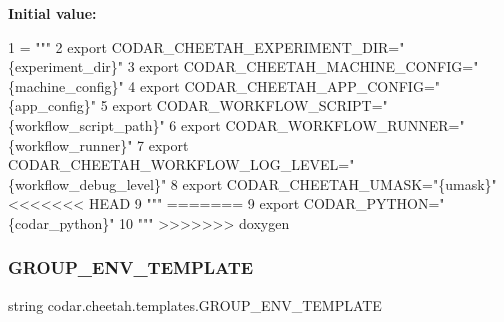 {\bfseries Initial value\+:}
\begin{DoxyCode}
1 =  \textcolor{stringliteral}{"""}
2 \textcolor{stringliteral}{export CODAR\_CHEETAH\_EXPERIMENT\_DIR="\{experiment\_dir\}"}
3 \textcolor{stringliteral}{export CODAR\_CHEETAH\_MACHINE\_CONFIG="\{machine\_config\}"}
4 \textcolor{stringliteral}{export CODAR\_CHEETAH\_APP\_CONFIG="\{app\_config\}"}
5 \textcolor{stringliteral}{export CODAR\_WORKFLOW\_SCRIPT="\{workflow\_script\_path\}"}
6 \textcolor{stringliteral}{export CODAR\_WORKFLOW\_RUNNER="\{workflow\_runner\}"}
7 \textcolor{stringliteral}{export CODAR\_CHEETAH\_WORKFLOW\_LOG\_LEVEL="\{workflow\_debug\_level\}"}
8 \textcolor{stringliteral}{export CODAR\_CHEETAH\_UMASK="\{umask\}"}
<<<<<<< HEAD
9 \textcolor{stringliteral}{"""}
=======
9 \textcolor{stringliteral}{export CODAR\_PYTHON="\{codar\_python\}"}
10 \textcolor{stringliteral}{"""}
>>>>>>> doxygen
\end{DoxyCode}
\mbox{\label{namespacecodar_1_1cheetah_1_1templates_a5f3128e651f6b9b80eb8c492b2f3edd1}} 
\subsubsection{\texorpdfstring{G\+R\+O\+U\+P\+\_\+\+E\+N\+V\+\_\+\+T\+E\+M\+P\+L\+A\+TE}{GROUP\_ENV\_TEMPLATE}}
{\footnotesize\ttfamily string codar.\+cheetah.\+templates.\+G\+R\+O\+U\+P\+\_\+\+E\+N\+V\+\_\+\+T\+E\+M\+P\+L\+A\+TE}

